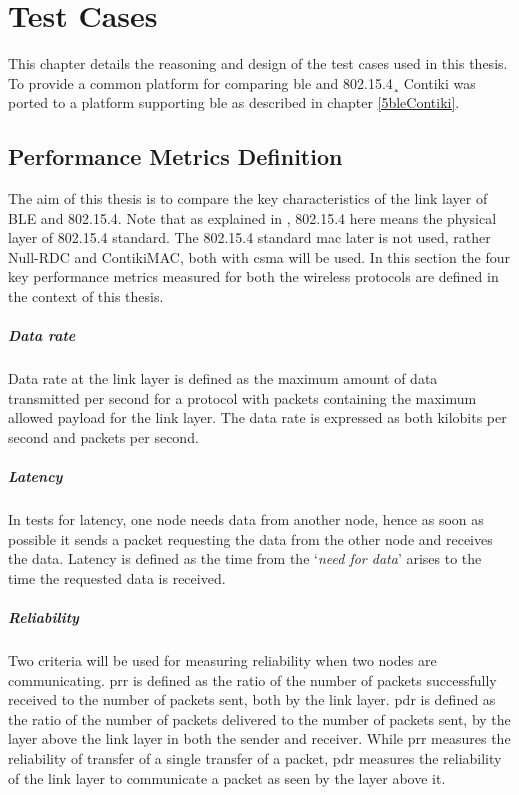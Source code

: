 \chapter{Test Cases} \label{6Testing}

This chapter details the reasoning and design of the test cases used in this thesis. To provide a common platform for comparing \gls{ble} and 802.15.4¸ Contiki was ported to a platform supporting \gls{ble} as described in chapter \ref{5bleContiki}. 

\section{Performance Metrics Definition} \label{6Metrics}
The aim of this thesis is to compare the key characteristics of the link layer of BLE and 802.15.4. Note that as explained in , 802.15.4 here means the physical layer of 802.15.4 standard. The 802.15.4 standard \gls{mac} later is not used, rather Null-RDC and ContikiMAC, both with \gls{csma} will be used. In this section the four key performance metrics measured for both the wireless protocols are defined in the context of this thesis.

\paragraph{Data rate}
Data rate at the link layer is defined as the maximum amount of data transmitted per second for a protocol with packets containing the maximum allowed payload for the link layer. The data rate is expressed as both kilobits per second and packets per second.

\paragraph{Latency}
In tests for latency, one node needs data from another node, hence as soon as possible it sends a packet requesting the data from the other node and receives the data. Latency is defined as the time from the `\emph{need for data}' arises to the time the requested data is received.

\paragraph{Reliability}
Two criteria will be used for measuring reliability when two nodes are communicating. \gls{prr} is defined as the ratio of the number of packets successfully received to the number of packets sent, both by the link layer. \gls{pdr} is defined as the ratio of the number of packets delivered to the number of packets sent, by the layer above the link layer in both the sender and receiver. While \gls{prr} measures the reliability of transfer of a single transfer of a packet, \gls{pdr} measures the reliability of the link layer to communicate a packet as seen by the layer above it.


